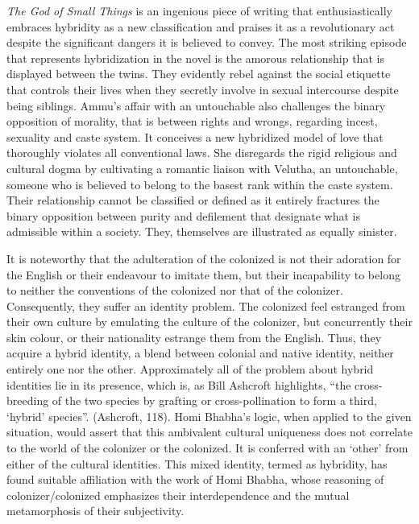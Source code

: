 \emph{The God of Small Things }is an ingenious piece of writing that enthusiastically embraces hybridity as a new classification and praises it as a revolutionary act despite the significant dangers it is believed to convey. The most striking episode that represents hybridization in the novel is the amorous relationship that is displayed between the twins. They evidently rebel against the social etiquette that controls their lives when they secretly involve in sexual intercourse despite being siblings. Ammu's affair with an untouchable also challenges the binary opposition of morality, that is between rights and wrongs, regarding incest, sexuality and caste system. It conceives a new hybridized model of love that thoroughly violates all conventional laws. She disregards the rigid religious and cultural dogma by cultivating a romantic liaison with Velutha, an untouchable, someone who is believed to belong to the basest rank within the caste system. Their relationship cannot be classified or defined as it entirely fractures the binary opposition between purity and defilement that designate what is admissible within a society. They, themselves are illustrated as equally sinister. 

It is noteworthy that the adulteration of the colonized is not their adoration for the English or their endeavour to imitate them, but their incapability to belong to neither the conventions of the colonized nor that of the colonizer. Consequently, they suffer an identity problem. The colonized feel estranged from their own culture by emulating the culture of the colonizer, but concurrently their skin colour, or their nationality estrange them from the English. Thus, they acquire a hybrid identity, a blend between colonial and native identity, neither entirely one nor the other. Approximately all of the problem about hybrid identities lie in its presence, which is, as Bill Ashcroft highlights, ``the cross-breeding of the two species by grafting or cross-pollination to form a third, `hybrid' species''. (Ashcroft, 118). Homi Bhabha's logic, when applied to the given situation, would assert that this ambivalent cultural uniqueness does not correlate to the world of the colonizer or the colonized. It is conferred with an `other' from either of the cultural identities. This mixed identity, termed as hybridity, has found suitable affiliation with the work of Homi Bhabha, whose reasoning of colonizer/colonized emphasizes their interdependence and the mutual metamorphosis of their subjectivity. 

